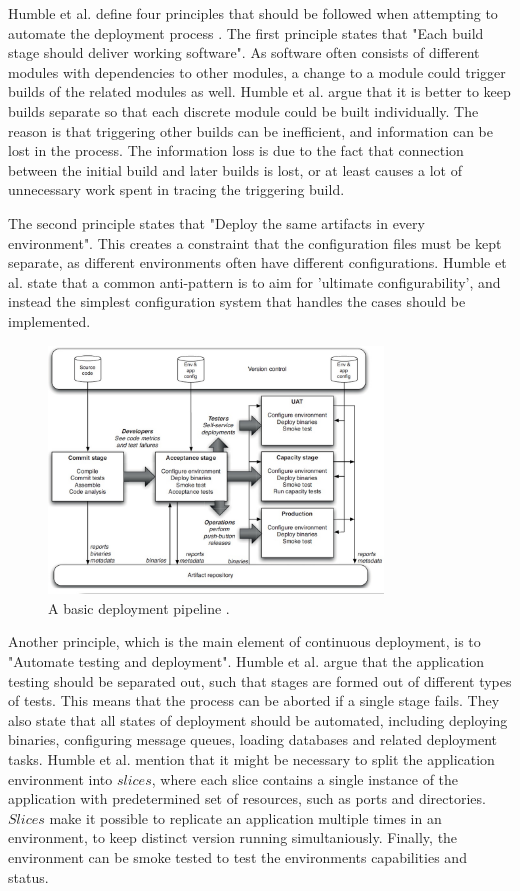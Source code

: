 \documentclass[english]{tktltiki2}
\theoremstyle{definition}
\theoremstyle{remark}
\begin{document}
Humble et al. define four principles that should be followed when attempting to automate the deployment process \cite{humble2006deployment}. The first principle states that "Each build stage should deliver working software". As software often consists of different modules with dependencies to other modules, a change to a module could trigger builds of the related modules as well. Humble et al. argue that it is better to keep builds separate so that each discrete module could be built individually. The reason is that triggering other builds can be inefficient, and information can be lost in the process. The information loss is due to the fact that connection between the initial build and later builds is lost, or at least causes a lot of unnecessary work spent in tracing the triggering build. 

The second principle states that "Deploy the same artifacts in every environment". This creates a constraint that the configuration files must be kept separate, as different environments often have different configurations. Humble et al. state that a common anti-pattern is to aim for 'ultimate configurability', and instead the simplest configuration system that handles the cases should be implemented.
\begin{figure}[h]
	\centering
	\includegraphics[width=3.5in]{pipeline.jpg}
	\caption{A basic deployment pipeline \cite{cdbook}.}
	\label{fig2}
\end{figure}
Another principle, which is the main element of continuous deployment, is to "Automate testing and deployment". Humble et al. argue that the application testing should be separated out, such that stages are formed out of different types of tests. This means that the process can be aborted if a single stage fails. They also state that all states of deployment should be automated, including deploying binaries, configuring message queues, loading databases and related deployment tasks. Humble et al. mention that it might be necessary to split the application environment into $slices$, where each slice contains a single instance of the application with predetermined set of resources, such as ports and directories. $Slices$ make it possible to replicate an application multiple times in an environment, to keep distinct version running simultaniously. Finally, the environment can be smoke tested to test the environments capabilities and status.
\end{document}
